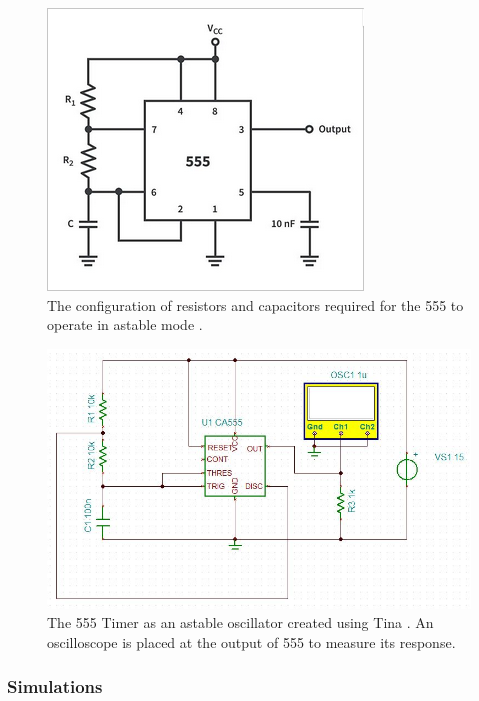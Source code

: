 \documentclass[%
 reprint,
 amsmath,amssymb,
 aps,
]{revtex4-2}
\begin{document}
    \begin{figure}
        \includegraphics[width=0.9\columnwidth]{Images/astable.png}
        \caption{\label{fig:astable}The configuration of resistors and capacitors required for the 555 to operate in astable mode \cite{555Modes}.}
    \end{figure}

    \begin{figure}
        \includegraphics[width=1.4\columnwidth]{Images/astableTina}
        \caption{\label{fig:astableTina}The 555 Timer as an astable oscillator created using Tina \cite{tina}. An oscilloscope is placed at the output of 555 to measure its response.}
    \end{figure}

        \subsubsection{Simulations}
\end{document}
